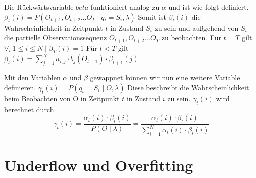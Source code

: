 Die Rückwärtsvariable $beta$ funktioniert analog zu $\alpha$ und ist wie folgt definiert.
$\beta_t(i) = P(O_{t+1}, O_{t+2} \dots O_T \mid q_t = S_i, \lambda)$
Somit ist $\beta_t(i)$ die Wahrscheinlichkeit in Zeitpunkt $t$ in Zustand $S_i$ zu sein
und außgehend von $S_i$ die partielle Observationssequenz $O_{t+1}, O_{t+2} \dots O_T$
zu beobachten.
Für $t = T$ gilt
$\forall_i \  1 \leq i \leq N \mid \beta_T(i) = 1  $
Für $t < T$ gilt
$\beta_t(i) = \sum_{j=1}^{N} a_{i,j} \cdot b_j(O_{t+1}) \cdot \beta_{t+1}(j)$

Mit den Variablen $\alpha$ und $\beta$ gewappnet können wir nun eine weitere Variable definieren.
$\gamma_t(i) = P(q_t = S_i \mid O, \lambda)$
Diese beschreibt die Wahrscheinlichkeit beim Beobachten von O in Zeitpunkt $t$ in Zustand $i$
zu sein. $\gamma_t(i)$ wird berechnet durch
\begin{equation}
\gamma_t(i)
= \frac{\alpha_t(i) \cdot \beta_t(i)}{P(O \mid \lambda)}
= \frac{\alpha_t(i) \cdot \beta_t(i)}{\sum_{i=1}^{N} \alpha_t(i) \cdot \beta_t(i)}
\end{equation}



\section{Underflow und Overfitting}














